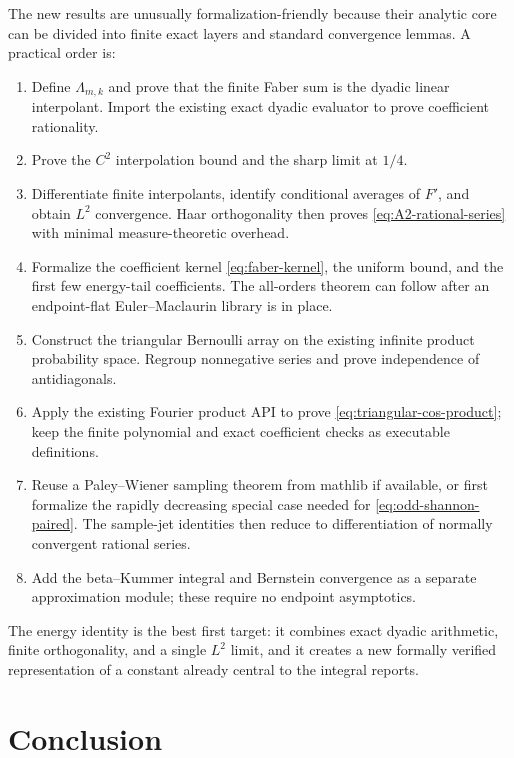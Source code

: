 \documentclass[11pt,oneside]{article}
\theoremstyle{definition}
\theoremstyle{remark}
\newcommand{\1}{\mathbf 1}
\begin{document}
The new results are unusually formalization-friendly because their analytic
core can be divided into finite exact layers and standard convergence lemmas.
A practical order is:

\begin{enumerate}
\item Define $\Lambda_{m,k}$ and prove that the finite Faber sum is the dyadic
      linear interpolant.  Import the existing exact dyadic evaluator to prove
      coefficient rationality.
\item Prove the $C^2$ interpolation bound and the sharp limit at $1/4$.
\item Differentiate finite interpolants, identify conditional averages of
      $F'$, and obtain $L^2$ convergence.  Haar orthogonality then proves
      \eqref{eq:A2-rational-series} with minimal measure-theoretic overhead.
\item Formalize the coefficient kernel \eqref{eq:faber-kernel}, the uniform
      bound, and the first few energy-tail coefficients.  The all-orders
      theorem can follow after an endpoint-flat Euler--Maclaurin library is in
      place.
\item Construct the triangular Bernoulli array on the existing infinite
      product probability space.  Regroup nonnegative series and prove
      independence of antidiagonals.
\item Apply the existing Fourier product API to prove
      \eqref{eq:triangular-cos-product}; keep the finite polynomial and exact
      coefficient checks as executable definitions.
\item Reuse a Paley--Wiener sampling theorem from mathlib if available, or
      first formalize the rapidly decreasing special case needed for
      \eqref{eq:odd-shannon-paired}.  The sample-jet identities then reduce to
      differentiation of normally convergent rational series.
\item Add the beta--Kummer integral and Bernstein convergence as a separate
      approximation module; these require no endpoint asymptotics.
\end{enumerate}

The energy identity is the best first target: it combines exact dyadic
arithmetic, finite orthogonality, and a single $L^2$ limit, and it creates a
new formally verified representation of a constant already central to the
integral reports.

\section{Conclusion}
\label{sec:conclusion}
\end{document}
